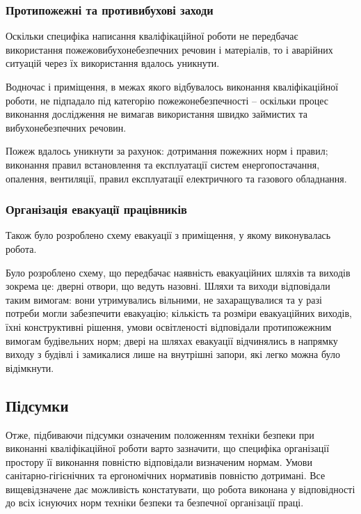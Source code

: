 \subsubsection{Протипожежні та противибухові заходи}

Оскільки специфіка написання кваліфікаційної роботи не передбачає використання пожежовибухонебезпечних речовин і матеріалів, то і аварійних ситуацій через їх використання вдалось уникнути.

Водночас і приміщення, в межах якого відбувалось виконання кваліфікаційної роботи, не підпадало під категорію пожежонебезпечності – оскільки процес виконання дослідження не вимагав використання швидко займистих та вибухонебезпечних речовин.

Пожеж вдалось уникнути за рахунок: дотримання пожежних норм і правил; виконання правил встановлення та експлуатації систем енергопостачання, опалення, вентиляції, правил експлуатації електричного та газового обладнання.


\subsubsection{Організація евакуації працівників}

Також було розроблено схему евакуації з приміщення, у якому виконувалась робота.

Було розроблено схему, що передбачає наявність евакуаційних шляхів та виходів зокрема це: дверні отвори, що ведуть назовні.
Шляхи та виходи відповідали таким вимогам: вони утримувались вільними, не захаращувалися та у разі потреби могли забезпечити евакуацію; кількість та розміри евакуаційних виходів, їхні конструктивні рішення, умови освітленості відповідали протипожежним вимогам будівельних норм; двері на шляхах евакуації відчинялись в напрямку виходу з будівлі і замикалися лише на внутрішні запори, які легко можна було відімкнути.

\subsection{Підсумки}
Отже, підбиваючи підсумки означеним положенням техніки безпеки при виконанні кваліфікаційної роботи варто зазначити, що специфіка організації простору її виконання повністю відповідали визначеним нормам. Умови санітарно-гігієнічних та ергономічних нормативів повністю дотримані. Все вищевідзначене дає можливість констатувати, що робота виконана у відповідності до всіх існуючих норм техніки безпеки та безпечної організації праці.

